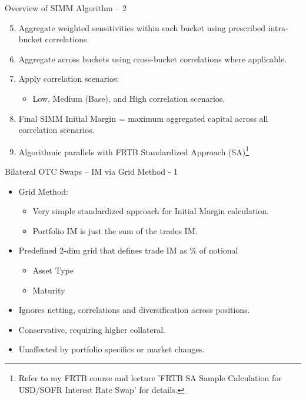 \documentclass[handout, aspectratio=169]{beamer}
\begin{document}
\begin{frame}{Overview of SIMM Algorithm – 2}
\begin{enumerate}
    \setcounter{enumi}{4}
    \item Aggregate weighted sensitivities within each bucket using prescribed intra-bucket correlations.
    \item Aggregate across buckets using cross-bucket correlations where applicable.
    \item Apply correlation scenarios:
    \begin{itemize}
        \item Low, Medium (Base), and High correlation scenarios.
    \end{itemize}
    \item Final SIMM Initial Margin = maximum aggregated capital across all correlation scenarios.
    \item Algorithmic parallels with FRTB Standardized Approach (SA)\footnote{Refer to my FRTB course and lecture 'FRTB SA Sample Calculation for USD/SOFR Interest Rate Swap' for details.}
\end{enumerate}
\end{frame}

\begin{frame}{Bilateral OTC Swaps – IM via Grid Method - 1}
  \begin{itemize}
    \item Grid Method: 
    \begin{itemize}
      \item Very simple standardized approach for Initial Margin calculation.
      \item Portfolio IM is just the sum of the trades IM.
    \end{itemize}
    \item Predefined 2-dim grid that defines trade IM as \% of notional  
    \begin{itemize}
      \item Asset Type  
      \item Maturity  
    \end{itemize}
    \item Ignores netting, correlations and diversification across positions.
    \item Conservative, requiring higher collateral.
    \item Unaffected by portfolio specifics or market changes.
  \end{itemize}
\end{frame}
\end{document}

